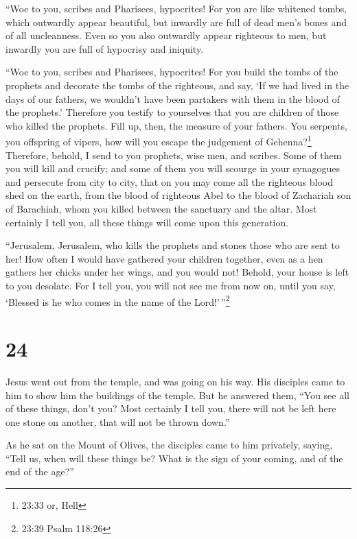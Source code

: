  ``Woe to you, scribes and Pharisees, hypocrites! For you
are like whitened tombs, which outwardly appear beautiful, but inwardly
are full of dead men's bones and of all uncleanness.  Even
so you also outwardly appear righteous to men, but inwardly you are full
of hypocrisy and iniquity.

 ``Woe to you, scribes and Pharisees, hypocrites! For you
build the tombs of the prophets and decorate the tombs of the righteous,
 and say, `If we had lived in the days of our fathers, we
wouldn't have been partakers with them in the blood of the prophets.'
 Therefore you testify to yourselves that you are children
of those who killed the prophets.  Fill up, then, the
measure of your fathers.  You serpents, you offspring of
vipers, how will you escape the judgement of Gehenna?\footnote{23:33 or,
  Hell}  Therefore, behold, I send to you prophets, wise
men, and scribes. Some of them you will kill and crucify; and some of
them you will scourge in your synagogues and persecute from city to
city,  that on you may come all the righteous blood shed on
the earth, from the blood of righteous Abel to the blood of Zachariah
son of Barachiah, whom you killed between the sanctuary and the altar.
 Most certainly I tell you, all these things will come upon
this generation.

 ``Jerusalem, Jerusalem, who kills the prophets and stones
those who are sent to her! How often I would have gathered your children
together, even as a hen gathers her chicks under her wings, and you
would not!  Behold, your house is left to you desolate.
 For I tell you, you will not see me from now on, until you
say, `Blessed is he who comes in the name of the Lord!'\,''\footnote{23:39
  Psalm 118:26}

\hypertarget{section-23}{%
\section{24}\label{section-23}}

 Jesus went out from the temple, and was going on his way.
His disciples came to him to show him the buildings of the temple.
 But he answered them, ``You see all of these things, don't
you? Most certainly I tell you, there will not be left here one stone on
another, that will not be thrown down.''

 As he sat on the Mount of Olives, the disciples came to him
privately, saying, ``Tell us, when will these things be? What is the
sign of your coming, and of the end of the age?''

